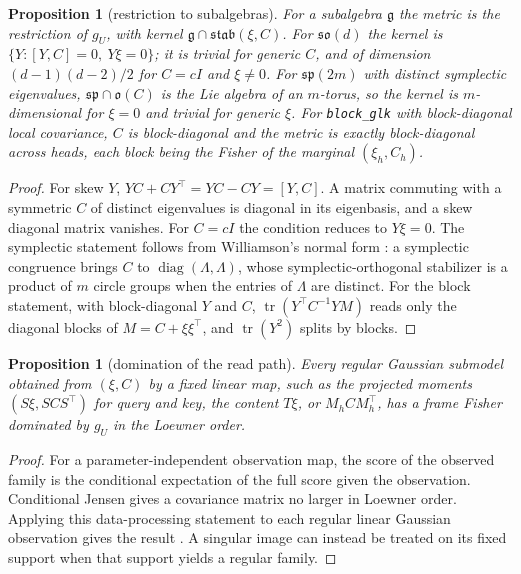 \documentclass[11pt]{article}
\newtheorem{proposition}[theorem]{Proposition}
\theoremstyle{definition}
\theoremstyle{remark}
\providecommand{\tr}{\operatorname{tr}}
\providecommand{\g}{\mathfrak{g}}
\providecommand{\stab}{\mathfrak{stab}}
\begin{document}
\begin{proposition}[restriction to subalgebras]\label{frame:prop:subalg}
For a subalgebra $\g$ the metric is the restriction of $g_U$, with kernel $\g\cap\stab(\xi,C)$. For $\mathfrak{so}(d)$ the kernel is $\{Y:[Y,C]=0,\ Y\xi=0\}$; it is trivial for generic $C$, and of dimension $(d-1)(d-2)/2$ for $C=cI$ and $\xi\neq0$. For $\mathfrak{sp}(2m)$ with distinct symplectic eigenvalues, $\mathfrak{sp}\cap\mathfrak{o}(C)$ is the Lie algebra of an $m$-torus, so the kernel is $m$-dimensional for $\xi=0$ and trivial for generic $\xi$. For \texttt{block\_glk} with block-diagonal local covariance, $C$ is block-diagonal and the metric is exactly block-diagonal across heads, each block being the Fisher of the marginal $(\xi_h,C_h)$.
\end{proposition}
\begin{proof}
For skew $Y$, $YC+CY^\top=YC-CY=[Y,C]$. A matrix commuting with a symmetric $C$ of distinct eigenvalues is diagonal in its eigenbasis, and a skew diagonal matrix vanishes. For $C=cI$ the condition reduces to $Y\xi=0$. The symplectic statement follows from Williamson's normal form \cite{frame:Williamson1936}: a symplectic congruence brings $C$ to $\operatorname{diag}(\Lambda,\Lambda)$, whose symplectic-orthogonal stabilizer is a product of $m$ circle groups when the entries of $\Lambda$ are distinct. For the block statement, with block-diagonal $Y$ and $C$, $\tr(Y^\top C^{-1}YM)$ reads only the diagonal blocks of $M=C+\xi\xi^\top$, and $\tr(Y^2)$ splits by blocks.
\end{proof}

\begin{proposition}[domination of the read path]\label{frame:prop:dominate}
Every regular Gaussian submodel obtained from $(\xi,C)$ by a fixed linear map, such as the projected moments $(S\xi,SCS^\top)$ for query and key, the content $T\xi$, or $M_hCM_h^\top$, has a frame Fisher dominated by $g_U$ in the Loewner order.
\end{proposition}
\begin{proof}
For a parameter-independent observation map, the score of the observed family is the conditional expectation of the full score given the observation. Conditional Jensen gives a covariance matrix no larger in Loewner order. Applying this data-processing statement to each regular linear Gaussian observation gives the result \cite{frame:Cencov1982,frame:AmariNagaoka2000}. A singular image can instead be treated on its fixed support when that support yields a regular family.
\end{proof}
\end{document}
